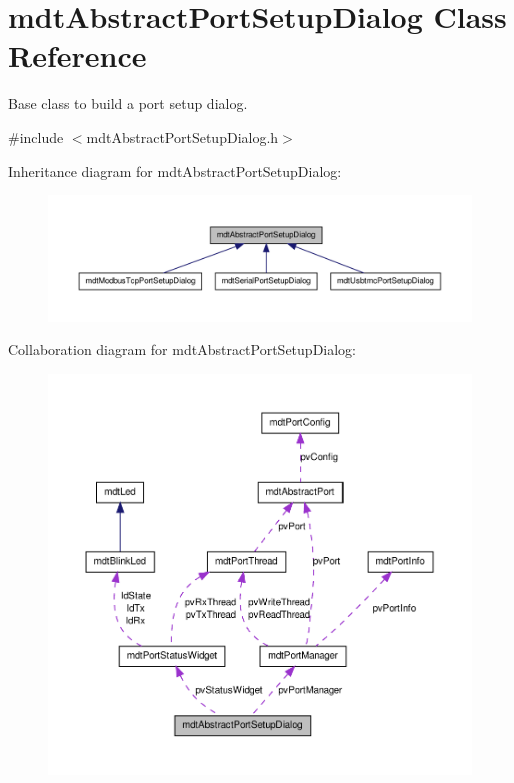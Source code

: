 \hypertarget{classmdt_abstract_port_setup_dialog}{
\section{mdtAbstractPortSetupDialog Class Reference}
\label{classmdt_abstract_port_setup_dialog}
}


Base class to build a port setup dialog.  




{\ttfamily \#include $<$mdtAbstractPortSetupDialog.h$>$}



Inheritance diagram for mdtAbstractPortSetupDialog:\nopagebreak
\begin{figure}[H]
\begin{center}
\leavevmode
\includegraphics[width=400pt]{classmdt_abstract_port_setup_dialog__inherit__graph}
\end{center}
\end{figure}


Collaboration diagram for mdtAbstractPortSetupDialog:\nopagebreak
\begin{figure}[H]
\begin{center}
\leavevmode
\includegraphics[width=400pt]{classmdt_abstract_port_setup_dialog__coll__graph}
\end{center}
\end{figure}
